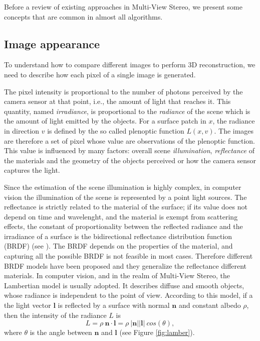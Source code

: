 Before a review of existing approaches  in Multi-View Stereo, we present some concepts that are common in almost all algorithms.

\subsection{Image appearance}
To understand how to compare different images to perform 3D reconstruction, we need to describe how each pixel of a single image is generated. 

The pixel intensity is proportional to the number of photons perceived by the camera sensor at that point, i.e., the amount of light that reaches it. This quantity, named \emph{irradiance}, is proportional to the \emph{radiance} of the scene which is the amount of light emitted by the objects.
For a surface patch in $x$, the radiance in direction $v$ is defined by the so called plenoptic function $L(x,v)$. 
The images are therefore a set of pixel whose value are observations of the plenoptic function.
This value is influenced by many factors: overall scene \emph{illumination}, \emph{reflectance} of the materials and the geometry of the objects perceived or how the camera sensor captures the light.

Since the estimation of the scene illumination is highly complex, in computer vision the illumination of the scene is represented by a point light sources.
The reflectance  is strictly related to the material of the surface;  if its value does not depend on time and wavelenght, and the material is exempt from scattering effects, the constant of proportionality between the reflected radiance and the irradiance of a surface is the bidirectional reflectance distribution function (BRDF) (see \cite{cohen2012radiosity}). 
The BRDF depends on the properties of the material, and capturing all the possible BRDF is not feasible in most cases. 
Therefore different BRDF models have been proposed and they generalize the reflectance different materials. 
In computer vision, and in the realm of Multi-View Stereo, the Lambertian model is usually adopted. It describes diffuse and smooth objects, whose radiance is independent to the point of view. 
According to this model, if a the light vector $\mathbf{l}$ is reflected by a surface with normal $\mathbf{n}$ and  constant albedo $\rho$, then the intensity of the radiance $L$ is 
\begin{equation}
  L = \rho \: \mathbf{n} \cdot \mathbf{l} = \rho \: |\mathbf{n}|  |\mathbf{l}| \: cos(\theta),
\end{equation}
where $\theta$ is the angle between $\mathbf{n}$ and $\mathbf{l}$ (see Figure \ref{fig:lamber}).

